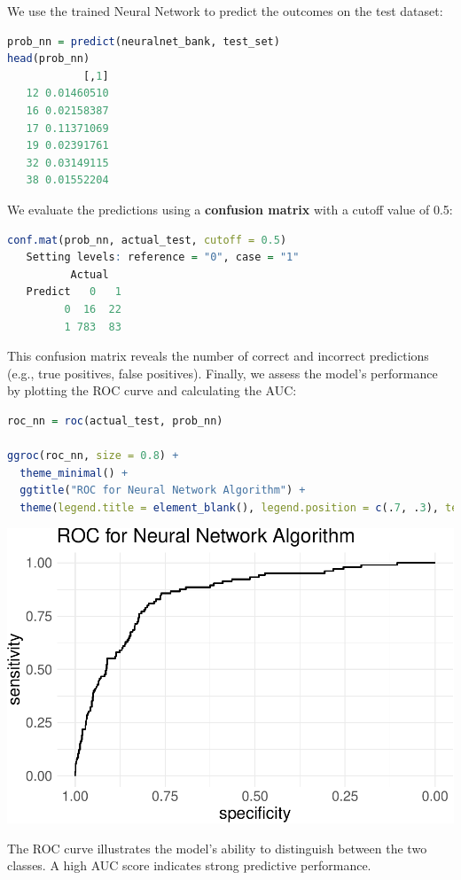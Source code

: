 \documentclass[
]{book}
\theoremstyle{definition}
\theoremstyle{definition}
\theoremstyle{definition}
\theoremstyle{definition}
\theoremstyle{remark}
\begin{document}
We use the trained Neural Network to predict the outcomes on the test dataset:

\begin{lstlisting}[language=R]
prob_nn = predict(neuralnet_bank, test_set)
head(prob_nn)
            [,1]
   12 0.01460510
   16 0.02158387
   17 0.11371069
   19 0.02391761
   32 0.03149115
   38 0.01552204
\end{lstlisting}

We evaluate the predictions using a \textbf{confusion matrix} with a cutoff value of 0.5:

\begin{lstlisting}[language=R]
conf.mat(prob_nn, actual_test, cutoff = 0.5)
   Setting levels: reference = "0", case = "1"
          Actual
   Predict   0   1
         0  16  22
         1 783  83
\end{lstlisting}

This confusion matrix reveals the number of correct and incorrect predictions (e.g., true positives, false positives). Finally, we assess the model's performance by plotting the ROC curve and calculating the AUC:

\begin{lstlisting}[language=R]
roc_nn = roc(actual_test, prob_nn)

ggroc(roc_nn, size = 0.8) + 
  theme_minimal() + 
  ggtitle("ROC for Neural Network Algorithm") +
  theme(legend.title = element_blank(), legend.position = c(.7, .3), text = element_text(size = 17))
\end{lstlisting}

\begin{center}\includegraphics[width=0.7\linewidth]{nn_files/figure-latex/unnamed-chunk-14-1} \end{center}

The ROC curve illustrates the model's ability to distinguish between the two classes. A high AUC score indicates strong predictive performance.
\end{document}
